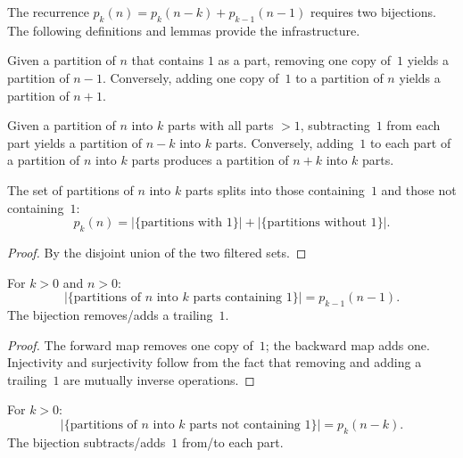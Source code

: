 The recurrence $p_k(n) = p_k(n-k) + p_{k-1}(n-1)$ requires two bijections.
The following definitions and lemmas provide the infrastructure.

\begin{definition}
\label{def.pars.removeOne-addOne}
\leanhelper
\leanok
Given a partition of $n$ that contains $1$ as a part, removing
one copy of~$1$ yields a partition of $n-1$.
Conversely, adding one copy of~$1$ to a partition of $n$
yields a partition of $n+1$.
\end{definition}

\begin{definition}
\label{def.pars.subtractOneFromEach-addOneToEach}
\leanhelper
\leanok
Given a partition of $n$ into $k$ parts with all parts $>1$,
subtracting~$1$ from each part yields a
partition of $n-k$ into $k$ parts.
Conversely, adding~$1$ to each part of a partition of $n$ into $k$ parts produces a
partition of $n+k$ into $k$ parts.
\end{definition}

\begin{lemma}
\label{lem.pars.partsCount-split}
\leanhelper
\leanok
The set of partitions of $n$ into $k$ parts splits into those containing~$1$
and those not containing~$1$:
\[
p_k(n) = |\{\text{partitions with 1}\}| + |\{\text{partitions without 1}\}|.
\]
\end{lemma}

\begin{proof}
By the disjoint union of the two filtered sets.
\end{proof}

\begin{lemma}
\label{lem.pars.partsWithOne-card-eq}
\leanhelper
\leanok
For $k>0$ and $n>0$:
\[
|\{\text{partitions of $n$ into $k$ parts containing 1}\}| = p_{k-1}(n-1).
\]
The bijection removes/adds a trailing~$1$.
\end{lemma}

\begin{proof}
The forward map removes one copy of~$1$; the backward map adds one.
Injectivity and surjectivity follow from the fact that removing and adding a trailing~$1$
are mutually inverse operations.
\end{proof}

\begin{lemma}
\label{lem.pars.partsWithoutOne-card-eq}
\leanhelper
\leanok
For $k>0$:
\[
|\{\text{partitions of $n$ into $k$ parts not containing 1}\}| = p_k(n-k).
\]
The bijection subtracts/adds~$1$ from/to each part.
\end{lemma}

